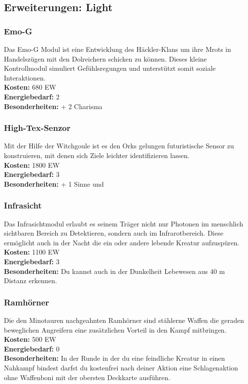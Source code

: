 
\subsection*{Erweiterungen: Light}

\subsubsection*{Emo-G}
Das Emo-G Modul ist eine Entwicklung des Häckler-Klans um ihre Mrots in Handelszügen mit den Dolreichern schicken zu können. Dieses kleine Kontrollmodul simuliert Gefühlsregungen und unterstützt somit soziale Interaktionen. \\
\textbf{Kosten:} 680 EW\\
\textbf{Energiebedarf:} 2 \\
\textbf{Besonderheiten:} + 2 Charisma

\subsubsection*{High-Tex-Senzor}\label{entw:high-tex}
Mit der Hilfe der Witchgoule ist es den Orks gelungen futuristische Sensor zu konstruieren, mit denen sich Ziele leichter identifizieren lassen. \\
\textbf{Kosten:} 1800 EW\\
\textbf{Energiebedarf:} 3 \\
\textbf{Besonderheiten:} + 1 Sinne und \textit{}

\subsubsection*{Infrasicht} \label{entw:infrasicht}
Das Infrasichtmodul erlaubt es seinem Träger nicht nur Photonen im menschlich sichtbaren Bereich zu Detektieren, sondern auch im Infrarotbereich. Diese ermöglicht auch in der Nacht die ein oder andere lebende Kreatur aufzuspüren.\\
\textbf{Kosten:} 1100 EW\\
\textbf{Energiebedarf:} 3 \\
\textbf{Besonderheiten:} Du kannst auch in der Dunkelheit Lebewesen aus 40 m Distanz erkennen. 

\subsubsection*{Ramhörner}\label{entw:ramhörner}
Die den Minotauren nachgeahnten Ramhörner sind stählerne Waffen die geraden beweglichen Angreifern eine zusätzlichen Vorteil in den Kampf mitbringen. \\
\textbf{Kosten:} 500 EW \\
\textbf{Energiebedarf:} 0 \\
\textbf{Besonderheiten:} In der Runde in der du eine feindliche Kreatur in einen Nahkampf bindest darfst du kostenfrei nach deiner Aktion eine Schlagenaktion ohne Waffenboni mit der obersten Deckkarte ausführen.

